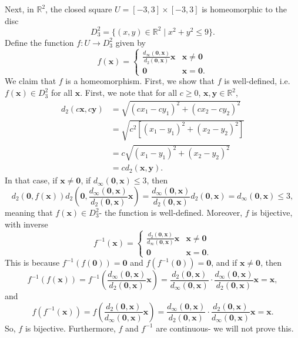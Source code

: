 \documentclass[a4paper, openany]{memoir}
\theoremstyle{definition}
\theoremstyle{plain}
\begin{document}
Next, in $\mathbb{R}^2$, the closed square $U = [-3, 3] \times [-3, 3]$ is homeomorphic to the disc 
\[D_3^2 = \{(x, y) \in \mathbb{R}^2 \mid x^2 + y^2 \leqslant 9\}.\]
Define the function $f: U \to D_3^2$ given by 
\[f(\bm{x}) = \begin{cases}
\frac{d_\infty(\bm{0}, \bm{x})}{d_2(\bm{0}, \bm{x})} \bm{x} & \bm{x} \neq \bm{0} \\
\bm{0} & \bm{x} = \bm{0}.
\end{cases}\]
We claim that $f$ is a homeomorphism. First, we show that $f$ is well-defined, i.e. $f(\bm{x}) \in D_3^2$ for all $\bm{x}$. First, we note that for all $c \geqslant 0$, $\bm{x}, \bm{y} \in \mathbb{R}^2$,
\begin{align*}
    d_2(c\bm{x}, c\bm{y}) &= \sqrt{(cx_1 - cy_1)^2 + (cx_2 - cy_2)^2} \\
    &= \sqrt{c^2[(x_1 - y_1)^2 + (x_2 - y_2)^2]} \\
    &= c \sqrt{(x_1  - y_1)^2 + (x_2 - y_2)^2} \\
    &= c d_2(\bm{x}, \bm{y}).
\end{align*}
In that case, if $\bm{x} \neq \bm{0}$, if $d_\infty(\bm{0}, \bm{x}) \leqslant 3$, then
\[d_2(\bm{0}, f(\bm{x})) d_2 \left(\bm{0}, \frac{d_\infty(\bm{0}, \bm{x})}{d_2(\bm{0}, \bm{x})} \bm{x} \right) = \frac{d_\infty(\bm{0}, \bm{x})}{d_2(\bm{0}, \bm{x})} d_2(\bm{0}, \bm{x}) = d_\infty(\bm{0}, \bm{x}) \leqslant 3,\]
meaning that $f(\bm{x}) \in D_3^2$- the function is well-defined. Moreover, $f$ is bijective, with inverse
\[f^{-1}(\bm{x}) = \begin{cases}
\frac{d_2(\bm{0}, \bm{x})}{d_\infty(\bm{0}, \bm{x})} \bm{x} & \bm{x} \neq \bm{0} \\
\bm{0} & \bm{x} = \bm{0}.
\end{cases}\]
This is because $f^{-1}(f(\bm{0})) = \bm{0}$ and $f(f^{-1}(\bm{0})) = \bm{0}$, and if $\bm{x} \neq \bm{0}$, then
\[f^{-1}(f(\bm{x})) = f^{-1} \left(\frac{d_\infty(\bm{0}, \bm{x})}{d_2(\bm{0}, \bm{x})} \bm{x}\right) = \frac{d_2(\bm{0}, \bm{x})}{d_\infty(\bm{0}, \bm{x})} \cdot \frac{d_\infty(\bm{0}, \bm{x})}{d_2(\bm{0}, \bm{x})} \bm{x} = \bm{x},\]
and
\[f(f^{-1}(\bm{x})) = f\left(\frac{d_2(\bm{0}, \bm{x})}{d_\infty(\bm{0}, \bm{x})} \bm{x}\right) = \frac{d_\infty(\bm{0}, \bm{x})}{d_2(\bm{0}, \bm{x})} \cdot \frac{d_2(\bm{0}, \bm{x})}{d_\infty(\bm{0}, \bm{x})} \bm{x} = \bm{x}.\]
So, $f$ is bijective. Furthermore, $f$ and $f^{-1}$ are continuous- we will not prove this.
\newpage
\end{document}
